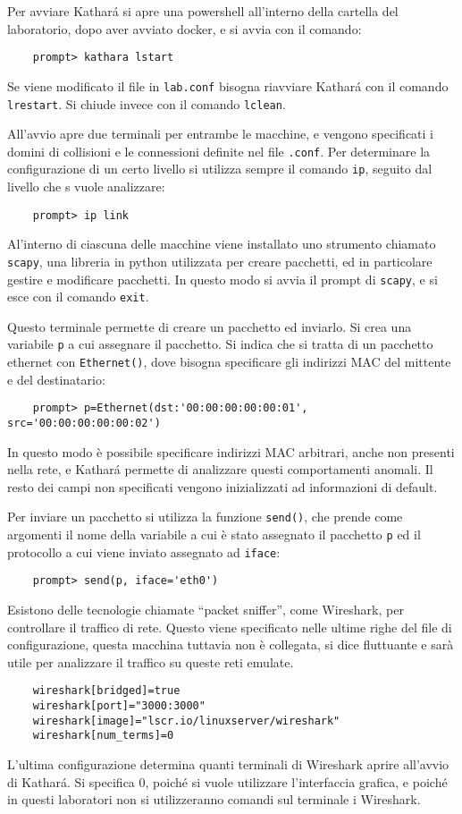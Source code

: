 \documentclass{article}
\numberwithin{equation}{subsection}
\begin{document}
Per avviare Kathar\'{a} si apre una powershell all'interno della cartella del laboratorio, dopo aver avviato docker, e si avvia con il comando:
\begin{verbatim}
    prompt> kathara lstart
\end{verbatim}

Se viene modificato il file in \verb|lab.conf| bisogna riavviare Kathará con il comando \verb|lrestart|. Si chiude invece con il comando \verb|lclean|. 

All'avvio apre due terminali per entrambe le macchine, e vengono specificati i domini di collisioni e le connessioni definite nel file \verb|.conf|. 
Per determinare la configurazione di un certo livello si utilizza sempre il comando \verb|ip|, seguito dal livello che s vuole analizzare:
\begin{verbatim}
    prompt> ip link
\end{verbatim}

Al'interno di ciascuna delle macchine viene installato uno strumento chiamato \verb|scapy|, una libreria in python utilizzata per creare pacchetti, ed in particolare 
gestire e modificare pacchetti. In questo modo si avvia il prompt di \verb|scapy|, e si esce con il comando \verb|exit|. 

Questo terminale permette di creare un pacchetto ed inviarlo. Si crea una variabile \verb|p| a cui assegnare il pacchetto. Si indica che si tratta di un 
pacchetto ethernet con \verb|Ethernet()|, dove bisogna specificare gli indirizzi MAC del mittente e del destinatario:
\begin{verbatim}
    prompt> p=Ethernet(dst:'00:00:00:00:00:01', src='00:00:00:00:00:02')
\end{verbatim} 
In questo modo è possibile specificare indirizzi MAC arbitrari, anche non presenti nella rete, e Kathar\'{a} permette di analizzare questi comportamenti anomali. 
Il resto dei campi non specificati vengono inizializzati ad informazioni di default. 

Per inviare un pacchetto si utilizza la funzione \verb|send()|, che prende come argomenti il nome della variabile a cui è stato assegnato il pacchetto \verb|p| ed 
il protocollo a cui viene inviato assegnato ad \verb|iface|:
\begin{verbatim}
    prompt> send(p, iface='eth0')
\end{verbatim}

Esistono delle tecnologie chiamate ``packet sniffer'', come Wireshark, per controllare il traffico di rete. Questo viene specificato nelle ultime righe del 
file di configurazione, questa macchina tuttavia non è collegata, si dice fluttuante e sarà utile per analizzare il traffico su queste reti emulate. 
\begin{verbatim}
    wireshark[bridged]=true
    wireshark[port]="3000:3000"
    wireshark[image]="lscr.io/linuxserver/wireshark"
    wireshark[num_terms]=0
\end{verbatim}
L'ultima configurazione determina quanti terminali di Wireshark aprire all'avvio di Kathar\'{a}. Si specifica 0, poiché si vuole utilizzare l'interfaccia grafica, e 
poiché in questi laboratori non si utilizzeranno comandi sul terminale i Wireshark. 
\end{document}
